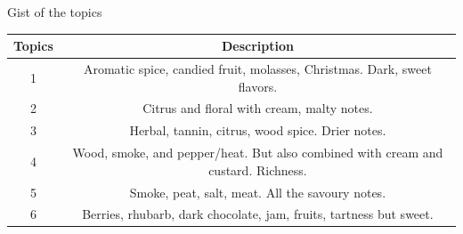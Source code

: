 \documentclass{beamer}
\begin{document}
	\begin{frame}{Gist of the topics}
		
		\begin{adjustbox}{max totalsize={.9\textwidth}{.7\textheight},center}
			
			\begin{tabular}{|c|c|}
				\hline
				\textbf{Topics} &  \textbf{Description}\\
				\hline
				1 & Aromatic spice, candied fruit, molasses, Christmas. Dark, sweet flavors. \\
				\hline
				2 & Citrus and floral with cream, malty notes. \\
				\hline
				3 & Herbal, tannin, citrus, wood spice. Drier notes. \\
				\hline
				4 & Wood, smoke, and pepper/heat. But also combined with cream and custard. Richness.  \\
				\hline
				5 & Smoke, peat, salt, meat. All the savoury notes. \\
				\hline
				6 & Berries, rhubarb, dark chocolate, jam, fruits, tartness but sweet.  \\
				\hline
			\end{tabular}
			
			
			

\end{adjustbox}
\end{frame}
\end{document}

